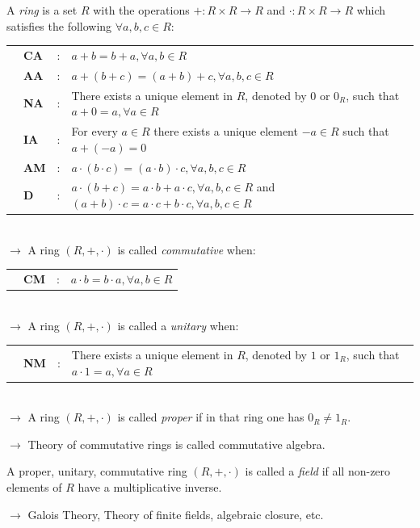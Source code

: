 \begin{definition}[title = Definition Ring]
    A \textit{ring} is a set $R$ with the operations $+: R \times R \to R$ and $\cdot: R \times R \to R$ which satisfies the following $\forall a, b, c \in R$:  \\[0.5em]
    \begin{tabular}{@{}l l l l@{}}
        \quad & \textbf{CA} & : & $a + b = b + a, \forall a, b \in R$ \\
        \quad & \textbf{AA} & : & $a + (b + c) = (a + b) + c, \forall a, b, c \in R$ \\
        \quad & \textbf{NA} & : & There exists a unique element in $R$, denoted by $0$ or $0_R$, such that $a + 0 = a, \forall a \in R$ \\
        \quad & \textbf{IA} & : & For every $a \in R$ there exists a unique element $-a \in R$ such that $a + (-a) = 0$ \\
        \quad & \textbf{AM} & : & $a \cdot (b \cdot c) = (a \cdot b) \cdot c, \forall a, b, c \in R$ \\
        \quad & \textbf{D} & :& $a \cdot (b + c) = a \cdot b + a \cdot c, \forall a, b, c \in R$ and $(a + b) \cdot c = a \cdot c + b \cdot c, \forall a, b, c \in R$ \\
    \end{tabular} \\[1em]
    $\rightarrow$ A ring $(R, +, \cdot)$ is called \textit{commutative} when: \\[0.5em]
    \begin{tabular}{@{}l l l l@{}}
        \quad & \textbf{CM} & : & $a \cdot b = b \cdot a, \forall a, b \in R$ \\
    \end{tabular}\\[1em]
    $\rightarrow$ A ring $(R, + , \cdot)$ is called a \textit{unitary} when: \\[0.5em]
    \begin{tabular}{@{}l l l l@{}}
        \quad & \textbf{NM} & : & There exists a unique element in $R$, denoted by $1$ or $1_R$, such that $a \cdot 1 = a, \forall a \in R$ \\
    \end{tabular} \\[1em]
    $\rightarrow$ A ring $(R, +, \cdot)$ is called \textit{proper} if in that ring one has $0_R \neq 1_R$.
\end{definition}
$\rightarrow$ Theory of commutative rings is called commutative algebra.

\begin{definition}[title = Definition Field] 
    A proper, unitary, commutative ring $(R, +, \cdot)$ is called a \textit{field} if all non-zero elements of $R$ have a multiplicative inverse.
\end{definition} 
$\rightarrow$ Galois Theory, Theory of finite fields, algebraic closure, etc.

